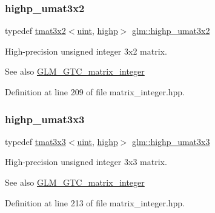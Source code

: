 \subsubsection{\texorpdfstring{highp\_umat3x2}{highp\_umat3x2}}
{\footnotesize\ttfamily typedef \mbox{\hyperlink{structglm_1_1tmat3x2}{tmat3x2}}$<$\mbox{\hyperlink{group__core__precision_ga4fd29415871152bfb5abd588334147c8}{uint}}, \mbox{\hyperlink{namespaceglm_a0f04f086094c747d227af4425893f545ac6f7eab42eacbb10d59a58e95e362074}{highp}}$>$ \mbox{\hyperlink{group__gtc__matrix__integer_ga7484178233773045088b42f362dade86}{glm\+::highp\+\_\+umat3x2}}}

High-\/precision unsigned integer 3x2 matrix. \begin{DoxySeeAlso}{See also}
\mbox{\hyperlink{group__gtc__matrix__integer}{G\+L\+M\+\_\+\+G\+T\+C\+\_\+matrix\+\_\+integer}} 
\end{DoxySeeAlso}


Definition at line 209 of file matrix\+\_\+integer.\+hpp.

\mbox{\label{group__gtc__matrix__integer_ga770b01686af4fbbb13bbd7bd97d60fe4}} 
\subsubsection{\texorpdfstring{highp\_umat3x3}{highp\_umat3x3}}
{\footnotesize\ttfamily typedef \mbox{\hyperlink{structglm_1_1tmat3x3}{tmat3x3}}$<$\mbox{\hyperlink{group__core__precision_ga4fd29415871152bfb5abd588334147c8}{uint}}, \mbox{\hyperlink{namespaceglm_a0f04f086094c747d227af4425893f545ac6f7eab42eacbb10d59a58e95e362074}{highp}}$>$ \mbox{\hyperlink{group__gtc__matrix__integer_ga770b01686af4fbbb13bbd7bd97d60fe4}{glm\+::highp\+\_\+umat3x3}}}

High-\/precision unsigned integer 3x3 matrix. \begin{DoxySeeAlso}{See also}
\mbox{\hyperlink{group__gtc__matrix__integer}{G\+L\+M\+\_\+\+G\+T\+C\+\_\+matrix\+\_\+integer}} 
\end{DoxySeeAlso}


Definition at line 213 of file matrix\+\_\+integer.\+hpp.

\mbox{\label{group__gtc__matrix__integer_gaa2fb29026c9c80c7d17b5389e36d6aa7}} 
